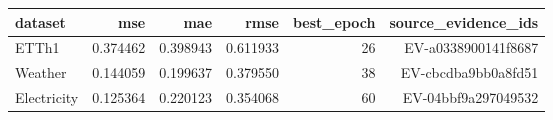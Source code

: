 \begin{tabular}{lrrrrr}
\hline
dataset & mse & mae & rmse & best\_epoch & source\_evidence\_ids \\
\hline
ETTh1 & 0.374462 & 0.398943 & 0.611933 & 26 & EV-a0338900141f8687 \\
Weather & 0.144059 & 0.199637 & 0.379550 & 38 & EV-cbcdba9bb0a8fd51 \\
Electricity & 0.125364 & 0.220123 & 0.354068 & 60 & EV-04bbf9a297049532 \\
\hline
\end{tabular}
